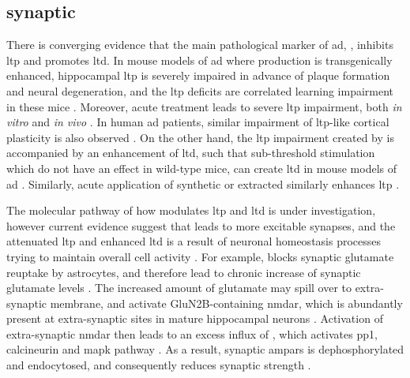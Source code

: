 \subsection{synaptic \label{ad.synaptic}}

There is converging evidence that the main pathological marker of \gls{ad}, \abeta, inhibits \gls{ltp} and promotes \gls{ltd}. In mouse models of \gls{ad} where \abeta{} production is transgenically enhanced, hippocampal \gls{ltp} is severely impaired in advance of plaque formation and neural degeneration, and the \gls{ltp} deficits are correlated learning impairment in these mice \citep{hsia99, chapman99, roberson11}. Moreover, acute \abeta{} treatment leads to severe \gls{ltp} impairment, both \textit{in vitro} \citep{lambert98, shankar08} and \textit{in vivo} \citep{walsh02, hu08}. In human \gls{ad} patients, similar impairment of \gls{ltp}-like cortical plasticity is also observed \citep{inghilleri06, koch12}. On the other hand, the \gls{ltp} impairment created by \abeta{} is accompanied by an enhancement of \gls{ltd}, such that sub-threshold stimulation which do not have an effect in wild-type mice, can create \gls{ltd} in mouse models of \gls{ad} \citep{hsia99, fitzjohn01, jacobsen06}. 
Similarly, acute application of synthetic or extracted \abeta{} similarly enhances \gls{ltp} \citep{hsieh06, li09}. 

The molecular pathway of how \abeta{} modulates \gls{ltp} and \gls{ltd} is under investigation, however current evidence suggest that \abeta{} leads to more excitable synapses, and the attenuated \gls{ltp} and enhanced \gls{ltd} is a result of neuronal homeostasis processes trying to maintain overall cell activity \citep{guntupalli16, jang16}. For example, \abeta{} blocks synaptic glutamate reuptake by astrocytes, and therefore lead to chronic increase of synaptic glutamate levels \citep{matos08, li09}. The increased amount of glutamate may spill over to extra-synaptic membrane, and activate GluN2B-containing \gls{nmdar}, which is abundantly present at extra-synaptic sites in mature hippocampal neurons \citep{citri08, li11, shipton14}. Activation of extra-synaptic \gls{nmdar} then leads to an excess influx of , which activates \gls{pp1}, calcineurin and \gls{mapk} pathway \citep{hsieh06, shankar07, zhao10}. As a result, synaptic \glspl{ampar} is dephosphorylated and endocytosed, and consequently reduces synaptic strength \citep{hsieh06, liu10, minanomolina11}. 

